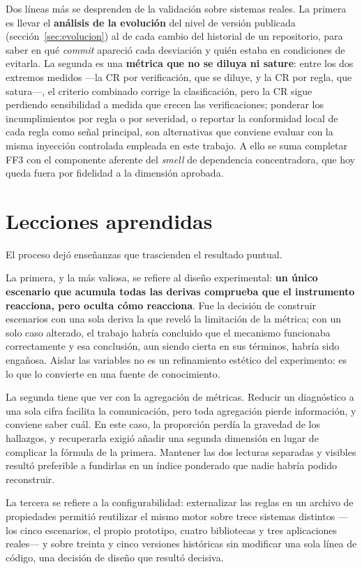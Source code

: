 Dos líneas más se desprenden de la validación sobre sistemas reales. La primera es llevar el \textbf{análisis de la evolución} del nivel de versión publicada (sección~\ref{sec:evolucion}) al de cada cambio del historial de un repositorio, para saber en qué \textit{commit} apareció cada desviación y quién estaba en condiciones de evitarla. La segunda es una \textbf{métrica que no se diluya ni sature}: entre los dos extremos medidos ---la CR por verificación, que se diluye, y la CR por regla, que satura---, el criterio combinado corrige la clasificación, pero la CR sigue perdiendo sensibilidad a medida que crecen las verificaciones; ponderar los incumplimientos por regla o por severidad, o reportar la conformidad local de cada regla como señal principal, son alternativas que conviene evaluar con la misma inyección controlada empleada en este trabajo. A ello se suma completar FF3 con el componente aferente del \textit{smell} de dependencia concentradora, que hoy queda fuera por fidelidad a la dimensión aprobada.

\section{Lecciones aprendidas}
El proceso dejó enseñanzas que trascienden el resultado puntual.

La primera, y la más valiosa, se refiere al diseño experimental: \textbf{un único escenario que acumula todas las derivas comprueba que el instrumento reacciona, pero oculta cómo reacciona}. Fue la decisión de construir escenarios con una sola deriva la que reveló la limitación de la métrica; con un solo caso alterado, el trabajo habría concluido que el mecanismo funcionaba correctamente y esa conclusión, aun siendo cierta en sus términos, habría sido engañosa. Aislar las variables no es un refinamiento estético del experimento: es lo que lo convierte en una fuente de conocimiento.

La segunda tiene que ver con la agregación de métricas. Reducir un diagnóstico a una sola cifra facilita la comunicación, pero toda agregación pierde información, y conviene saber cuál. En este caso, la proporción perdía la gravedad de los hallazgos, y recuperarla exigió añadir una segunda dimensión en lugar de complicar la fórmula de la primera. Mantener las dos lecturas separadas y visibles resultó preferible a fundirlas en un índice ponderado que nadie habría podido reconstruir.

La tercera se refiere a la configurabilidad: externalizar las reglas en un archivo de propiedades permitió reutilizar el mismo motor sobre trece sistemas distintos —los cinco escenarios, el propio prototipo, cuatro bibliotecas y tres aplicaciones reales— y sobre treinta y cinco versiones históricas sin modificar una sola línea de código, una decisión de diseño que resultó decisiva.

